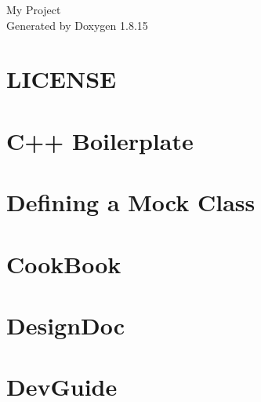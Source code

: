 \documentclass[twoside]{book}
\newcommand{\+}{\discretionary{\mbox{\scriptsize$\hookleftarrow$}}{}{}}
\newcommand{\clearemptydoublepage}{%
  \newpage{\pagestyle{empty}\cleardoublepage}%
}
\begin{document}
\hypersetup{pageanchor=false,
             bookmarksnumbered=true,
             pdfencoding=unicode
            }
\begin{titlepage}
\vspace*{7cm}
\begin{center}%
{\Large My Project }\\
\vspace*{1cm}
{\large Generated by Doxygen 1.8.15}\\
\end{center}
\end{titlepage}
\clearemptydoublepage
{}
\tableofcontents
\clearemptydoublepage
{}
\hypersetup{pageanchor=true}

\chapter{L\+I\+C\+E\+N\+SE}
\label{md__l_i_c_e_n_s_e}

\chapter{C++ Boilerplate}
\label{md_readme}

\chapter{Defining a Mock Class}
\label{md_vendor_googletest_googlemock_docs__cheat_sheet}

\chapter{Cook\+Book}
\label{md_vendor_googletest_googlemock_docs__cook_book}

\chapter{Design\+Doc}
\label{md_vendor_googletest_googlemock_docs__design_doc}

\chapter{Dev\+Guide}
\label{md_vendor_googletest_googlemock_docs__dev_guide}

\end{document}

